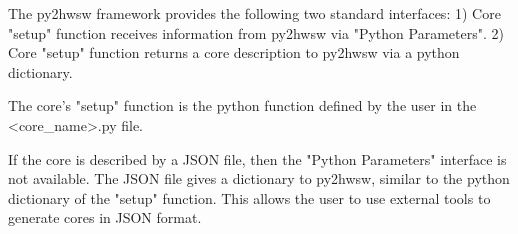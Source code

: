 %

The py2hwsw framework provides the following two standard interfaces:
1) Core "setup" function receives information from py2hwsw via "Python Parameters".
2) Core "setup" function returns a core description to py2hwsw via a python dictionary.

The core's "setup" function is the python function defined by the user in the <core_name>.py file.

If the core is described by a JSON file, then the "Python Parameters" interface is not available.
The JSON file gives a dictionary to py2hwsw, similar to the python dictionary of the "setup" function.
This allows the user to use external tools to generate cores in JSON format.


